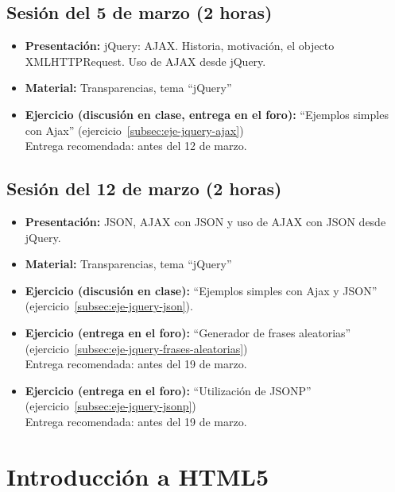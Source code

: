 \documentclass[a4paper,12pt]{report}
\begin{document}
\subsection{Sesión del 5 de marzo (2 horas)}

\begin{itemize}
\item \textbf{Presentación:} jQuery: AJAX. Historia, motivación, el objecto XMLHTTPRequest. Uso de AJAX desde jQuery.
\item \textbf{Material:} Transparencias, tema ``jQuery''
\item \textbf{Ejercicio (discusión en clase, entrega en el foro):} ``Ejemplos simples con Ajax'' (ejercicio~\ref{subsec:eje-jquery-ajax}) \\
  Entrega recomendada: antes del 12 de marzo.
\end{itemize}

\subsection{Sesión del 12 de marzo (2 horas)}

\begin{itemize}
\item \textbf{Presentación:} JSON, AJAX con JSON y uso de AJAX con JSON desde jQuery.
\item \textbf{Material:} Transparencias, tema ``jQuery''
\item \textbf{Ejercicio (discusión en clase):} ``Ejemplos simples con Ajax y JSON'' (ejercicio~\ref{subsec:eje-jquery-json}).
\item \textbf{Ejercicio (entrega en el foro):} ``Generador de frases aleatorias'' (ejercicio~\ref{subsec:eje-jquery-frases-aleatorias}) \\
  Entrega recomendada: antes del 19 de marzo.
\item \textbf{Ejercicio (entrega en el foro):} ``Utilización de JSONP'' (ejercicio~\ref{subsec:eje-jquery-jsonp}) \\
  Entrega recomendada: antes del 19 de marzo.
\end{itemize}


\section{Introducción a HTML5}
\end{document}
